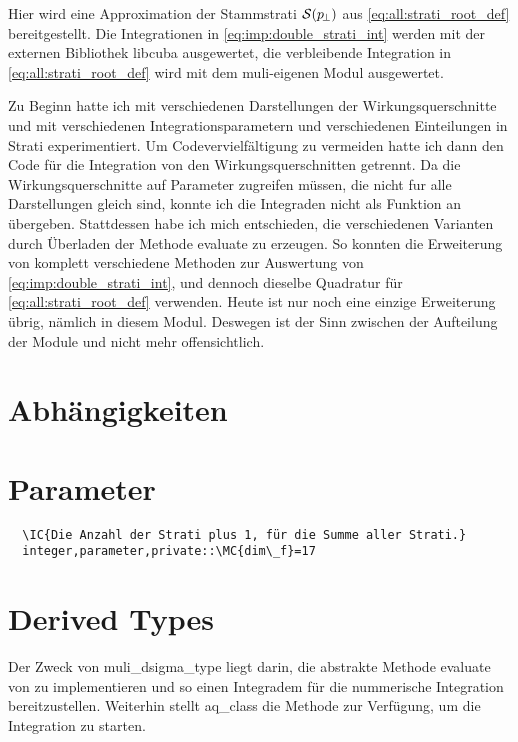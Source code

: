 Hier wird eine Approximation der Stammstrati $\mathcal{S}(p_{\!\perp})$ aus \eqref{eq:all:strati_root_def} bereitgestellt. Die Integrationen in \eqref{eq:imp:double_strati_int} werden mit der externen Bibliothek libcuba ausgewertet, die verbleibende Integration in \eqref{eq:all:strati_root_def} wird mit dem muli-eigenen Modul  ausgewertet.

Zu Beginn hatte ich mit verschiedenen Darstellungen der Wirkungsquerschnitte und mit verschiedenen Integrationsparametern und verschiedenen Einteilungen in Strati experimentiert. Um Codevervielfältigung zu vermeiden hatte ich dann den Code für die Integration von den Wirkungsquerschnitten getrennt. Da die Wirkungsquerschnitte auf Parameter zugreifen müssen, die nicht fur alle Darstellungen gleich sind, konnte ich die Integraden nicht als Funktion an  übergeben. Stattdessen habe ich mich entschieden, die verschiedenen Varianten durch Überladen der Methode evaluate zu erzeugen. So konnten die Erweiterung von  komplett verschiedene Methoden zur Auswertung von \eqref{eq:imp:double_strati_int}, und dennoch dieselbe Quadratur für \eqref{eq:all:strati_root_def} verwenden. Heute ist nur noch eine einzige Erweiterung übrig, nämlich  in diesem Modul. Deswegen ist der Sinn zwischen der Aufteilung der Module  und  nicht mehr offensichtlich.
\section{Abhängigkeiten}
\section{Parameter}
\begin{Verbatim}
  \IC{Die Anzahl der Strati plus 1, für die Summe aller Strati.}
  integer,parameter,private::\MC{dim\_f}=17
\end{Verbatim}
\section{Derived Types}
Der Zweck von muli\_dsigma\_type liegt darin, die abstrakte Methode evaluate von  zu implementieren und so einen Integradem für die nummerische Integration bereitzustellen. Weiterhin stellt aq\_class die Methode  zur Verfügung, um die Integration zu starten.

